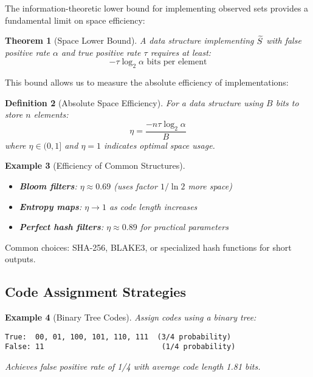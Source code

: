 \documentclass[11pt,final,hidelinks]{article}
\newtheorem{theorem}{Theorem}[section]
\newtheorem{definition}[theorem]{Definition}
\newtheorem{example}[theorem]{Example}
\begin{document}
The information-theoretic lower bound for implementing observed sets provides a fundamental limit on space efficiency:

\begin{theorem}[Space Lower Bound]
A data structure implementing $\widetilde{S}$ with false positive rate $\alpha$ and true positive rate $\tau$ requires at least:
\begin{equation}
-\tau \log_2 \alpha \text{ bits per element}
\end{equation}
\end{theorem}

This bound allows us to measure the absolute efficiency of implementations:

\begin{definition}[Absolute Space Efficiency]
For a data structure using $B$ bits to store $n$ elements:
\begin{equation}
\eta = \frac{-n\tau \log_2 \alpha}{B}
\end{equation}
where $\eta \in (0, 1]$ and $\eta = 1$ indicates optimal space usage.
\end{definition}

\begin{example}[Efficiency of Common Structures]
\begin{itemize}
    \item \textbf{Bloom filters}: $\eta \approx 0.69$ (uses factor $1/\ln 2$ more space)
    \item \textbf{Entropy maps}: $\eta \to 1$ as code length increases
    \item \textbf{Perfect hash filters}: $\eta \approx 0.89$ for practical parameters
\end{itemize}
\end{example}

Common choices: SHA-256, BLAKE3, or specialized hash functions for short outputs.

\subsection{Code Assignment Strategies}

\begin{example}[Binary Tree Codes]
Assign codes using a binary tree:
\begin{verbatim}
True:  00, 01, 100, 101, 110, 111  (3/4 probability)
False: 11                           (1/4 probability)
\end{verbatim}
Achieves false positive rate of 1/4 with average code length 1.81 bits.
\end{example}
\end{document}
